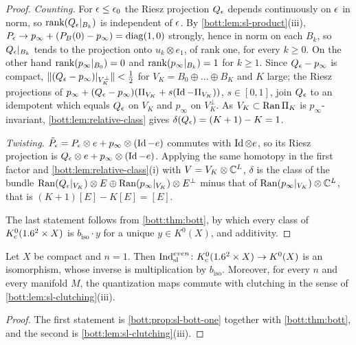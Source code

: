 \begin{proof}
  \emph{Counting.} For $\epsilon\le\epsilon_0$ the Riesz projection $Q_\epsilon$ depends continuously on
  $\epsilon$ in norm, so $\operatorname{rank}(Q_\epsilon|_{B_k})$ is independent of $\epsilon$. By
  \cref{bott:lem:sl-product}(iii), $P_\epsilon\to p_\infty+(P_B(0)-p_\infty)=\operatorname{diag}(1,0)$ strongly,
  hence in norm on each $B_k$, so $Q_\epsilon|_{B_k}$ tends to the projection onto
  $u_k\otimes e_1$, of rank one, for every $k\ge0$. On the other hand
  $\operatorname{rank}(p_\infty|_{B_0})=0$ and $\operatorname{rank}(p_\infty|_{B_k})=1$ for $k\ge1$. Since $Q_\epsilon-p_\infty$
  is compact, $\lVert (Q_\epsilon-p_\infty)|_{V_K^\perp}\rVert<\frac12$ for $V_K=B_0\oplus\dots\oplus B_K$ and
  $K$ large; the Riesz projections of $p_\infty+(Q_\epsilon-p_\infty)(\Pi_{V_K}+s(\operatorname{Id}-\Pi_{V_K}))$,
  $s\in[0,1]$, join $Q_\epsilon$ to an idempotent which equals $Q_\epsilon$ on $V_K$ and $p_\infty$ on
  $V_K^\perp$. As $V_K\subset\operatorname{Ran}\Pi_K$ is $p_\infty$-invariant,
  \cref{bott:lem:relative-class} gives $\delta(Q_\epsilon)=(K+1)-K=1$.

  \emph{Twisting.} $\tilde P_\epsilon=P_\epsilon\otimes e+p_\infty\otimes(\operatorname{Id}-e)$ commutes with
  $\operatorname{Id}\otimes e$, so its Riesz projection is $Q_\epsilon\otimes e+p_\infty\otimes(\operatorname{Id}-e)$. Applying
  the same homotopy in the first factor and \cref{bott:lem:relative-class}(i) with
  $V=V_K\otimes\mathbb{C}^L$, $\delta$ is the class of the bundle
  $\operatorname{Ran}(Q_\epsilon|_{V_K})\otimes E\oplus\operatorname{Ran}(p_\infty|_{V_K})\otimes E^\perp$ minus that of
  $\operatorname{Ran}(p_\infty|_{V_K})\otimes\mathbb{C}^L$, that is $(K+1)[E]-K[E]=[E]$.

  The last statement follows from \cref{bott:thm:bott}, by which every class of
  $K_{\mathrm{c}}^0(1.6^2\times X)$ is $b_{\mathrm{iso}}\cdot y$ for a unique $y\in K^0(X)$, and additivity.
\end{proof}

\begin{theorem}\label{bott:thm:sl-iso}
  Let $X$ be compact and $n=1$. Then
  $\operatorname{Ind}^{even}_{\mathrm{sl}}\colon K_{\mathrm{c}}^0(1.6^{2}\times X)\to K^0(X)$ is an isomorphism, whose inverse is
  multiplication by $b_{\mathrm{iso}}$. Moreover, for every $n$ and every manifold $M$, the
  quantization maps commute with clutching in the sense of \cref{bott:lem:sl-clutching}(iii).
\end{theorem}
\begin{proof}
  The first statement is \cref{bott:prop:sl-bott-one} together with \cref{bott:thm:bott}, and
  the second is \cref{bott:lem:sl-clutching}(iii).
\end{proof}

